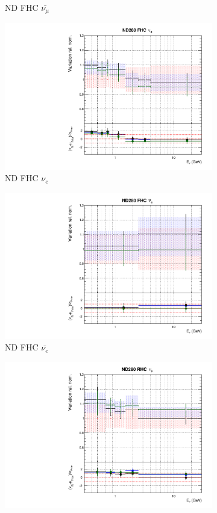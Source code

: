 \begin{figure}
\begin{subfigure}{0.24\textwidth}
  \caption{ND FHC $\bar{\nu_{\mu}}$}
\end{subfigure}
\begin{subfigure}{0.24\textwidth}
  \centering
  \includegraphics[width=0.95\linewidth]{figs/newolddatafitsflux_2}
  \caption{ND FHC $\nu_e$}
\end{subfigure}
\begin{subfigure}{0.24\textwidth}
  \centering
  \includegraphics[width=0.95\linewidth]{figs/newolddatafitsflux_3}
  \caption{ND FHC $\bar{\nu_{e}}$}
\end{subfigure}
\begin{subfigure}{0.24\textwidth}
  \centering
  \includegraphics[width=0.95\linewidth]{figs/newolddatafitsflux_4}

\end{subfigure}
\end{figure}

